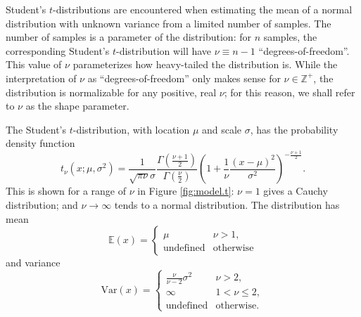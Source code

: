 \documentclass[fleqn,usenatbib]{rasti}
\begin{document}
Student's $t$-distributions are encountered when estimating the mean of a normal
distribution with unknown variance from a limited number of samples. The number
of samples is a parameter of the distribution: for $n$ samples, the
corresponding Student's $t$-distribution will have $\nu \equiv n - 1$
``degrees-of-freedom''. This value of $\nu$ parameterizes how heavy-tailed the
distribution is. While the interpretation of $\nu$ as ``degrees-of-freedom''
only makes sense for $\nu \in \mathbb Z^+$, the distribution is normalizable for
any positive, real $\nu$; for this reason, we shall refer to $\nu$ as the shape
parameter.

The Student's $t$-distribution, with location $\mu$ and scale $\sigma$, has
the probability density function
\begin{equation}
    t_{\nu} \left(x; {\mu}, {\sigma^2}\right)
        =
    \frac{1}{\sqrt{\pi \nu} \sigma}
    \frac{
        \Gamma \left(\frac{\nu + 1}2\right)
    }{
        \Gamma \left(\frac{\nu}2\right)
    }
    \left(
        1 + \frac{1}{\nu} \frac{\left(x - \mu\right)^2}{\sigma^2}
    \right)^{
        -\frac{\nu + 1}{2}
    }.
\end{equation}
This is shown for a range of $\nu$ in Figure \ref{fig:model.t}: $\nu
= 1$ gives a Cauchy distribution; and $\nu \rightarrow \infty$ tends to a normal
distribution. The distribution has mean
\begin{equation}
    \mathbb{E}(x)
        =
    \begin{cases}
        \mu & \nu > 1, \\
        \textrm{undefined} & \textrm{otherwise}
    \end{cases}
\end{equation}
and variance
\begin{equation}
    \mathrm{Var}(x)
        =
    \begin{cases}
        \frac{\nu}{\nu - 2} \sigma^2 & \nu > 2, \\
        \infty & 1 < \nu \leq 2, \\
        \textrm{undefined} & \textrm{otherwise.}
    \end{cases}
\end{equation}
\end{document}
